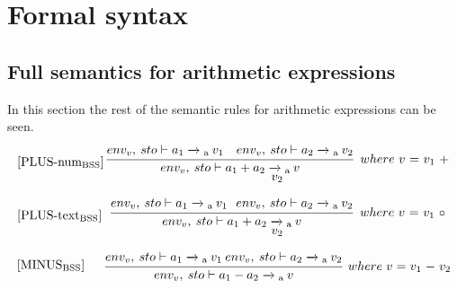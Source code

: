 \chapter{Formal syntax}\label{app:semantics}
\section{Full semantics for arithmetic expressions}\label{AppSec:SemainticsArithmeticExpr}
In this section the rest of the semantic rules for arithmetic expressions can be seen.
\begin{equation}
\begin{minipage}{.2\linewidth}
$[\text{PLUS-num}_\text{BSS}]$
\end{minipage}
\begin{minipage}{.8\linewidth}
\centering
$\cfrac{env_v, \: sto \vdash a_1 \xrightarrow{}\textsubscript{a} \: v_1 \quad env_v, \: sto \vdash a_2 \xrightarrow{}\textsubscript{a} \: v_2}{env_v, \: sto \vdash a_1 + a_2 \xrightarrow{}\textsubscript{a} \: v}$
$ \: where$ $v$ $=$ $v_1$ $+$ $v_2$
\end{minipage}
\end{equation}

\begin{equation}
\begin{minipage}{.2\linewidth}
$[\text{PLUS-text}_\text{BSS}]$
\end{minipage}
\begin{minipage}{.8\linewidth}
\centering
$\cfrac{env_v, \: sto \vdash a_1 \xrightarrow{}\textsubscript{a} \: v_1 \: \: \: env_v, \: sto \vdash a_2 \xrightarrow{}\textsubscript{a} \: v_2}{env_v, \: sto \vdash a_1 + a_2 \xrightarrow{}\textsubscript{a} \: v}$
$ \: where$ $v$ $=$ $v_1$ $\circ$ $v_2$
\end{minipage}
\end{equation}

\begin{equation}
\begin{minipage}{.2\linewidth}
$[\text{MINUS}_\text{BSS}]$
\end{minipage}
\begin{minipage}{.8\linewidth}
\centering
$\cfrac{env_v, \: sto \vdash a_1 \xrightarrow{}\textsubscript{a} \: v_1 \: env_v, \: sto \vdash a_2 \xrightarrow{}\textsubscript{a} \: v_2}{env_v, \: sto \vdash a_1 - a_2 \xrightarrow{}\textsubscript{a} \: v}$
$ \: where$ $v$ $=$ $v_1$ $-$ $v_2$
\end{minipage}
\end{equation}

